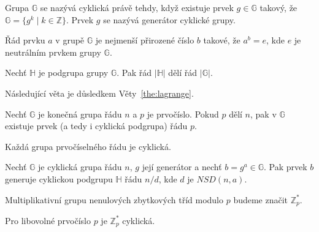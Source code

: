 \documentclass[
  program=infoi,
  biblatex=false,
  figures=true,
  glossaries,
  tables=false,
  sourcecodes=true,
  index
]{kidiplom}
\begin{document}

    \begin{definition}
        Grupa $\mathbb{G}$ se nazývá cyklická právě tehdy, když existuje prvek $g \in \mathbb{G}$ takový,
        že~$\mathbb{G}=\{g^k \mid k \in \mathbb{Z}\}$.
        Prvek $g$ se nazývá generátor cyklické grupy.
    \end{definition}

    \begin{definition}\label{def:element-order}
        Řád prvku $a$ v grupě $\mathbb{G}$ je nejmenší přirozené číslo $b$ takové, že $a^b = e$, kde $e$ je
        neutrálním prvkem grupy $\mathbb{G}$.
    \end{definition}


    \begin{theorem}\label{the:lagrange}
        Nechť $\mathbb{H}$ je podgrupa grupy $\mathbb{G}$. Pak řád $|\mathbb{H}|$ dělí řád $|\mathbb{G}|$.
    \end{theorem}

    \noindent
    Následující věta je důsledkem Věty~\ref{the:lagrange}.

    \begin{theorem}\label{the:cauchy}
        Nechť $\mathbb{G}$ je konečná grupa řádu $n$ a $p$ je prvočíslo.
        Pokud $p$ dělí $n$, pak v $\mathbb{G}$ existuje prvek (a tedy i cyklická podgrupa) řádu $p$.
    \end{theorem}

    \begin{consequence}\label{con:prime-cyclic}
        Každá grupa prvočíselného řádu je cyklická.
    \end{consequence}

    \begin{theorem}\label{the:subgroups}
        Nechť $\mathbb{G}$ je cyklická grupa řádu $n$, $g$ její generátor a nechť $b = g^a \in \mathbb{G}$.
        Pak prvek $b$ generuje cyklickou podgrupu $\mathbb{H}$ řádu $n/d$, kde $d$ je $NSD(n,a)$.
    \end{theorem}

    \begin{definition}\label{def:Z*p}
        Multiplikativní grupu nenulových zbytkových tříd modulo $p$ budeme značit $\mathbb{Z}^*_p$.
    \end{definition}

    \begin{theorem}
        Pro libovolné prvočíslo $p$ je $\mathbb{Z}^*_p$ cyklická.
    \end{theorem}
\end{document}
